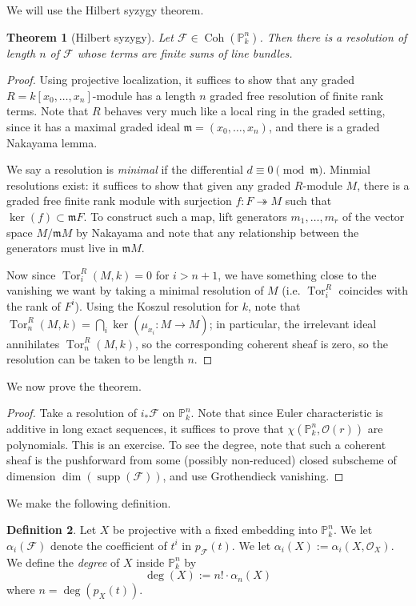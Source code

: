 \documentclass[10pt]{article}
\newtheorem{thm}{Theorem}[section]
\theoremstyle{definition}
\newtheorem{defn}[thm]{Definition}
\DeclareMathOperator{\supp}{supp}
\DeclareMathOperator{\Coh}{Coh}
\DeclareMathOperator{\Tor}{Tor}
\newcommand{\mf}{\mathfrak}
\newcommand{\PP}{\mathbb{P}}
\newcommand{\OO}{\mathcal{O}}
\begin{document}
We will use the Hilbert syzygy theorem.
\begin{thm}[Hilbert syzygy]
Let $\mathcal{F} \in \Coh(\mathbb{P}^n_k)$.  Then there is a resolution of length $n$ of $\mathcal{F}$ whose terms are finite sums of line bundles.
\end{thm}
\begin{proof}
Using projective localization, it suffices to show that any graded $R = k[x_0, \ldots, x_n]$-module has a length $n$ graded free resolution of finite rank terms.  Note that $R$ behaves very much like a local ring in the graded setting, since it has a maximal graded ideal $\mf{m} = (x_0, \ldots, x_n)$, and there is a graded Nakayama lemma.

We say a resolution is \emph{minimal} if the differential $d \equiv 0 \pmod{\mf{m}}$.  Minmial resolutions exist: it suffices to show that given any graded $R$-module $M$, there is a graded free finite rank module with surjection $f: F \twoheadrightarrow M$ such that $\ker(f) \subset \mf{m} F$.  To construct such a map, lift generators $m_1, \ldots, m_r$ of the vector space $M/\mf{m}M$ by Nakayama and note that any relationship between the generators must live in $\mf{m}M$.

Now since $\Tor_i^R(M, k) = 0$ for $i > n+1$, we have something close to the vanishing we want by taking a minimal resolution of $M$ (i.e. $\Tor_i^R$ coincides with the rank of $F^i$).  Using the Koszul resolution for $k$, note that $\Tor_n^R(M, k) = \bigcap_i \ker(\mu_{x_i}: M \rightarrow M)$; in particular, the irrelevant ideal annihilates $\Tor_n^R(M, k)$, so the corresponding coherent sheaf is zero, so the resolution can be taken to be length $n$.
\end{proof}

We now prove the theorem.
\begin{proof}
Take a resolution of $i_* \mathcal{F}$ on $\PP^n_k$.  Note that since Euler characteristic is additive in long exact sequences, it suffices to prove that $\chi(\PP^n_k, \OO(r))$ are polynomials.  This is an exercise.  To see the degree, note that such a coherent sheaf is the pushforward from some (possibly non-reduced) closed subscheme of dimension $\dim(\supp(\mathcal{F}))$, and use Grothendieck vanishing.
\end{proof}

We make the following definition.
\begin{defn}
Let $X$ be projective with a fixed embedding into $\PP^n_k$.  We let $\alpha_i(\mathcal{F})$ denote the coefficient of $t^i$ in $p_{\mathcal{F}}(t)$.  We let $\alpha_i(X) := \alpha_i(X, \OO_X)$.  We define the \emph{degree} of $X$ inside $\PP^n_k$ by 
$$\deg(X) := n! \cdot \alpha_n(X)$$
where $n = \deg(p_X(t))$.
\end{defn}
\end{document}
